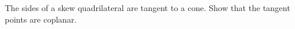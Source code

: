 The sides of a skew quadrilateral are tangent to a cone. Show that the tangent points are coplanar.
